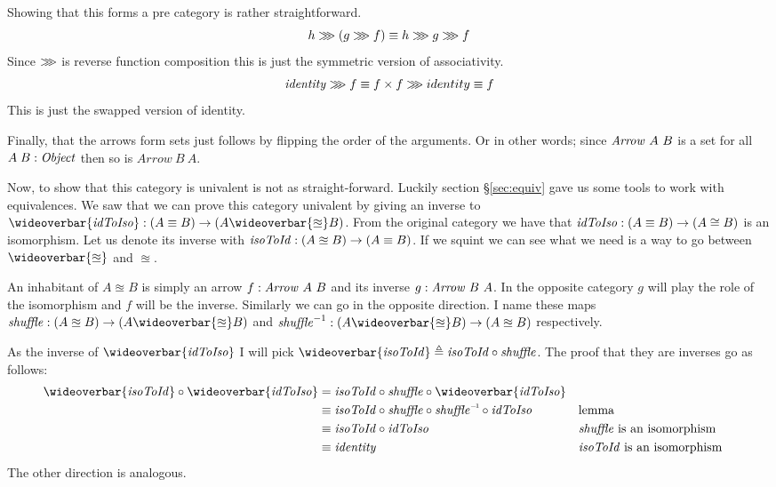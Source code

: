 Showing that this forms a pre category is rather straightforward. 
%
$$
h \ggg (g \ggg f) \equiv h \ggg g \ggg f
$$
%
Since $\ggg$ is reverse function composition this is just the symmetric version
of associativity.
%
$$
\identity \rrr f \equiv f \x f \rrr identity \equiv f
$$
%
This is just the swapped version of identity.

Finally, that the arrows form sets just follows by flipping the order of the
arguments. Or in other words; since $\Arrow\ A\ B$ is a set for all $A\;B \tp
\Object$ then so is $Arrow\ B\ A$.

Now, to show that this category is univalent is not as straight-forward. Luckily
section \S\ref{sec:equiv} gave us some tools to work with equivalences. We saw
that we can prove this category univalent by giving an inverse to
$\wideoverbar{\idToIso} \tp (A \equiv B) \to (A \wideoverbar{\approxeq} B)$.
From the original category we have that $\idToIso \tp (A \equiv B) \to (A \cong
B)$ is an isomorphism. Let us denote its inverse with $\isoToId \tp (A
\approxeq B) \to (A \equiv B)$. If we squint we can see what we need is a way to
go between $\wideoverbar{\approxeq}$ and $\approxeq$.

An inhabitant of $A \approxeq B$ is simply an arrow $f \tp \Arrow\ A\ B$
and its inverse $g \tp \Arrow\ B\ A$. In the opposite category $g$ will
play the role of the isomorphism and $f$ will be the inverse. Similarly we can
go in the opposite direction. I name these maps $\shufflef \tp (A \approxeq
B) \to (A \wideoverbar{\approxeq} B)$ and $\shufflef^{-1} \tp (A
\wideoverbar{\approxeq} B) \to (A \approxeq B)$ respectively.

As the inverse of $\wideoverbar{\idToIso}$ I will pick $\wideoverbar{\isoToId}
\defeq \isoToId \comp \shufflef$. The proof that they are inverses go as
follows:
%
\begin{align*}
\wideoverbar{\isoToId} \comp \wideoverbar{\idToIso} & =
\isoToId \comp \shufflef \comp \wideoverbar{\idToIso}
\\
%
& \equiv
\isoToId \comp \shufflef \comp \inv{\shufflef} \comp \idToIso
&& \text{lemma} \\
& \equiv
\isoToId \comp \idToIso
&& \text{$\shufflef$ is an isomorphism} \\
& \equiv
\identity
&& \text{$\isoToId$ is an isomorphism}
\end{align*}
%
The other direction is analogous.

